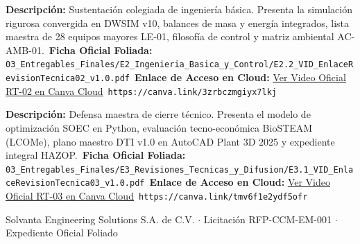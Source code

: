 \documentclass[11pt,letterpaper]{article}
\begin{document}
\vspace{0.2cm}
\begin{tcolorbox}[colframe=solvantaAccent,colback=white,arc=1.5mm,title=\textbf{Video 02 $\cdot$ Entregable E2.2: Video de Sustentaci\'on T\'ecnica -- RT-02 (Fase E2)}]
    \textbf{Descripci\'on:} Sustentaci\'on colegiada de ingenier\'ia b\'asica. Presenta la simulaci\'on rigurosa convergida en DWSIM v10, balances de masa y energ\'ia integrados, lista maestra de 28 equipos mayores LE-01, filosof\'ia de control y matriz ambiental AC-AMB-01.\
    \textbf{Ficha Oficial Foliada:} \texttt{03\_Entregables\_Finales/E2\_Ingenieria\_Basica\_y\_Control/E2.2\_VID\_EnlaceRevisionTecnica02\_v1.0.pdf}\
    \textbf{Enlace de Acceso en Cloud:} \href{https://canva.link/3zrbczmgiyx7lkj}{\color{solvantaAccent}\underline{Ver Video Oficial RT-02 en Canva Cloud}}\
    \small\texttt{https://canva.link/3zrbczmgiyx7lkj}
\end{tcolorbox}

\vspace{0.2cm}
\begin{tcolorbox}[colframe=solvantaAccent,colback=white,arc=1.5mm,title=\textbf{Video 03 $\cdot$ Entregable E3.1: Video de Defensa Maestra -- RT-03 (Fase E3)}]
    \textbf{Descripci\'on:} Defensa maestra de cierre t\'ecnico. Presenta el modelo de optimizaci\'on SOEC en Python, evaluaci\'on tecno-econ\'omica BioSTEAM (LCOMe), plano maestro DTI v1.0 en AutoCAD Plant 3D 2025 y expediente integral HAZOP.\
    \textbf{Ficha Oficial Foliada:} \texttt{03\_Entregables\_Finales/E3\_Revisiones\_Tecnicas\_y\_Difusion/E3.1\_VID\_EnlaceRevisionTecnica03\_v1.0.pdf}\
    \textbf{Enlace de Acceso en Cloud:} \href{https://canva.link/tmv6f1e2ydf5ofr}{\color{solvantaAccent}\underline{Ver Video Oficial RT-03 en Canva Cloud}}\
    \small\texttt{https://canva.link/tmv6f1e2ydf5ofr}
\end{tcolorbox}

\vfill
\begin{center}
    {\footnotesize\color{gray} Solvanta Engineering Solutions S.A. de C.V. $\cdot$ Licitaci\'on RFP-CCM-EM-001 $\cdot$ Expediente Oficial Foliado}
\end{center}
\end{document}
